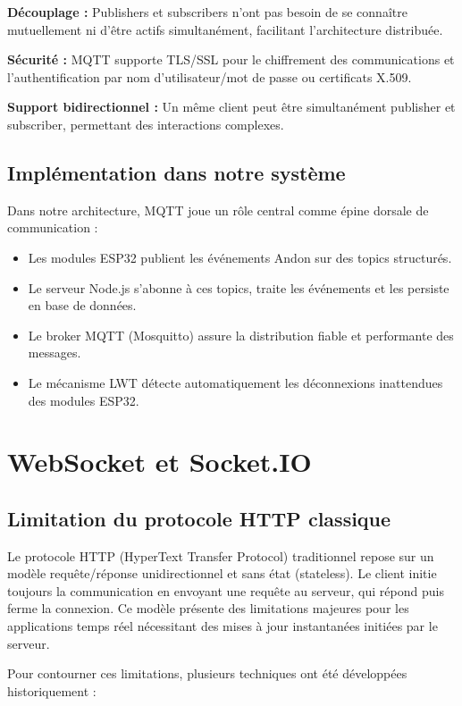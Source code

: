 \textbf{Découplage :} Publishers et subscribers n'ont pas besoin de se connaître mutuellement ni d'être actifs simultanément, facilitant l'architecture distribuée.

\textbf{Sécurité :} MQTT supporte TLS/SSL pour le chiffrement des communications et l'authentification par nom d'utilisateur/mot de passe ou certificats X.509.

\textbf{Support bidirectionnel :} Un même client peut être simultanément publisher et subscriber, permettant des interactions complexes.

\subsection{Implémentation dans notre système}

Dans notre architecture, MQTT joue un rôle central comme épine dorsale de communication :

\begin{itemize}
    \item Les modules ESP32 publient les événements Andon sur des topics structurés.
    \item Le serveur Node.js s'abonne à ces topics, traite les événements et les persiste en base de données.
    \item Le broker MQTT (Mosquitto) assure la distribution fiable et performante des messages.
    \item Le mécanisme LWT détecte automatiquement les déconnexions inattendues des modules ESP32.
\end{itemize}


\section{WebSocket et Socket.IO}

\subsection{Limitation du protocole HTTP classique}

Le protocole HTTP (HyperText Transfer Protocol) traditionnel repose sur un modèle requête/réponse unidirectionnel et sans état (stateless). Le client initie toujours la communication en envoyant une requête au serveur, qui répond puis ferme la connexion. Ce modèle présente des limitations majeures pour les applications temps réel nécessitant des mises à jour instantanées initiées par le serveur.

Pour contourner ces limitations, plusieurs techniques ont été développées historiquement :

